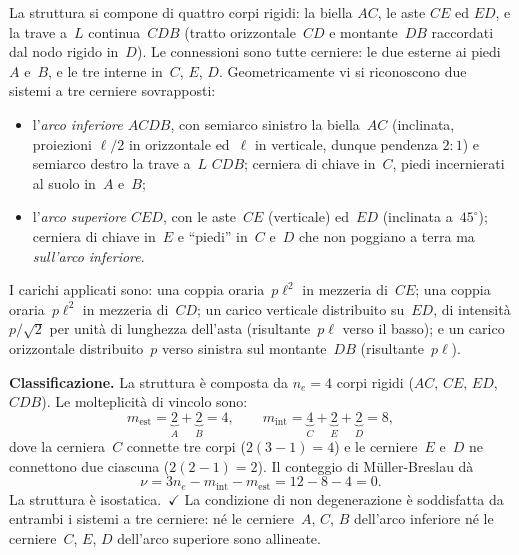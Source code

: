 La struttura si compone di quattro corpi rigidi: la biella
$AC$, le aste $CE$ ed $ED$, e la trave a~$L$ continua~$CDB$
(tratto orizzontale~$CD$ e montante~$DB$ raccordati dal nodo
rigido in~$D$). Le connessioni sono tutte cerniere: le due
esterne ai piedi~$A$ e~$B$, e le tre interne in~$C$, $E$,
$D$. Geometricamente vi si riconoscono due sistemi a tre
cerniere sovrapposti:
\begin{itemize}[noitemsep]
	\item l'\emph{arco inferiore $ACDB$}, con semiarco
	sinistro la biella~$AC$ (inclinata, proiezioni $\ell/2$
	in orizzontale ed~$\ell$ in verticale, dunque pendenza
	$2{:}1$) e semiarco destro la trave a~$L$ $CDB$; cerniera
	di chiave in~$C$, piedi incernierati al suolo in~$A$
	e~$B$;
	\item l'\emph{arco superiore $CED$}, con le aste~$CE$
	(verticale) ed~$ED$ (inclinata a~$45^\circ$); cerniera di
	chiave in~$E$ e ``piedi'' in~$C$ e~$D$ che non poggiano a
	terra ma \emph{sull'arco inferiore}.
\end{itemize}

I carichi applicati sono: una coppia oraria~$p\ell^2$ in
mezzeria di~$CE$; una coppia oraria~$p\ell^2$ in mezzeria
di~$CD$; un carico verticale distribuito su~$ED$, di
intensità $p/\!\sqrt2$ per unità di lunghezza dell'asta
(risultante~$p\ell$ verso il basso); e un carico orizzontale
distribuito~$p$ verso sinistra sul montante~$DB$
(risultante~$p\ell$).






\noindent\textbf{Classificazione.}
La struttura è composta da $n_e = 4$ corpi rigidi
($AC$, $CE$, $ED$, $CDB$). Le molteplicità di vincolo sono:
\[
m_{\mathrm{est}} = \underbrace{2}_{A} + \underbrace{2}_{B} = 4,
\qquad
m_{\mathrm{int}} = \underbrace{4}_{C} + \underbrace{2}_{E}
+ \underbrace{2}_{D} = 8,
\]
dove la cerniera~$C$ connette tre corpi ($2(3-1)=4$) e le
cerniere~$E$ e~$D$ ne connettono due ciascuna ($2(2-1)=2$).
Il conteggio di Müller-Breslau dà
\[
\nu = 3n_e - m_{\mathrm{int}} - m_{\mathrm{est}}
= 12 - 8 - 4 = 0.
\]
La struttura è isostatica.~$\checkmark$
La condizione di non degenerazione è soddisfatta da entrambi
i sistemi a tre cerniere: né le cerniere~$A$, $C$, $B$
dell'arco inferiore né le cerniere~$C$, $E$, $D$ dell'arco
superiore sono allineate.

